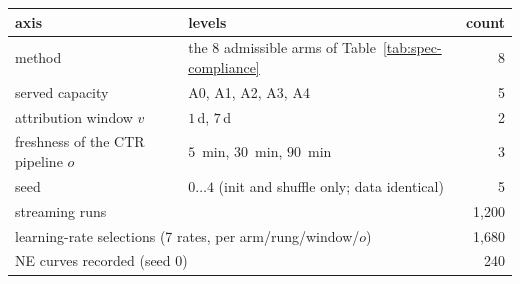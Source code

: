 \begin{tabular}{l l r}
\toprule
axis & levels & count\\
\midrule
method & the 8 admissible arms of Table~\ref{tab:spec-compliance} & 8\\
served capacity & A0, A1, A2, A3, A4 & 5\\
attribution window $v$ & $1$\,d, $7$\,d & 2\\
freshness of the CTR pipeline $o$ & $5$~min, $30$~min, $90$~min & 3\\
seed & $0\ldots4$ (init and shuffle only; data identical) & 5\\
\midrule
\multicolumn{2}{l}{streaming runs} & 1{,}200\\
\multicolumn{2}{l}{learning-rate selections (7 rates{,} per arm/rung/window/$o$)} & 1{,}680\\
\multicolumn{2}{l}{NE curves recorded (seed 0)} & 240\\
\bottomrule
\end{tabular}
